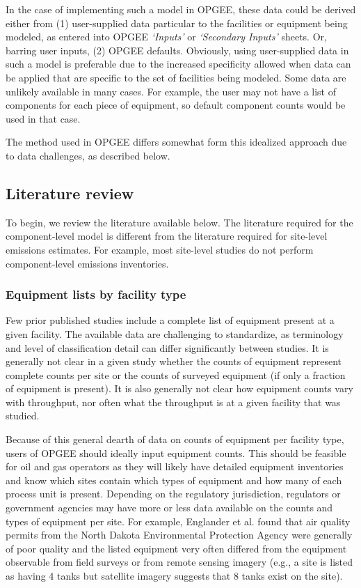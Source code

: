 \documentclass[11pt]{report}
\newcommand{\sheet}[1]{\textit{`{#1}'}}
\begin{document}
{{{{In the case of implementing such a model in OPGEE, these data could be derived either from (1) user-supplied data particular to the facilities or equipment being modeled, as entered into OPGEE \sheet{Inputs} or \sheet{Secondary Inputs} sheets. Or, barring user inputs, (2) OPGEE defaults. Obviously, using user-supplied data in such a model is preferable due to the increased specificity allowed when data can be applied that are specific to the set of facilities being modeled. Some data are unlikely available in many cases. For example, the user may not have a list of components for each piece of equipment, so default component counts would be used in that case.

The method used in OPGEE differs somewhat form this idealized approach due to data challenges, as described below.

\subsection{Literature review}

To begin, we review the literature available below. The literature required for the component-level model is different from the literature required for site-level emissions estimates. For example, most site-level studies do not perform component-level emissions inventories.


\subsubsection{Equipment lists by facility type}

Few prior published studies include a complete list of equipment present at a given facility. The available data are challenging to standardize, as terminology and level of classification detail can differ significantly between studies. It is generally not clear in a given study whether the counts of equipment represent complete counts per site or the counts of surveyed equipment (if only a fraction of equipment is present). It is also generally not clear how equipment counts vary with throughput, nor often what the throughput is at a given facility that was studied.

Because of this general dearth of data on counts of equipment per facility type, users of OPGEE should ideally input equipment counts. This should be feasible for oil and gas operators as they will likely have detailed equipment inventories and know which sites contain which types of equipment and how many of each process unit is present. Depending on the regulatory jurisdiction, regulators or government agencies may have more or less data available on the counts and types of equipment per site. For example, Englander et al. \cite{Englander2018} found that air quality permits from the North Dakota Environmental Protection Agency were generally of poor quality and the listed equipment very often differed from the equipment observable from field surveys or from remote sensing imagery (e.g., a site is listed as having 4 tanks but satellite imagery suggests that 8 tanks exist on the site).

}}}}
\end{document}
